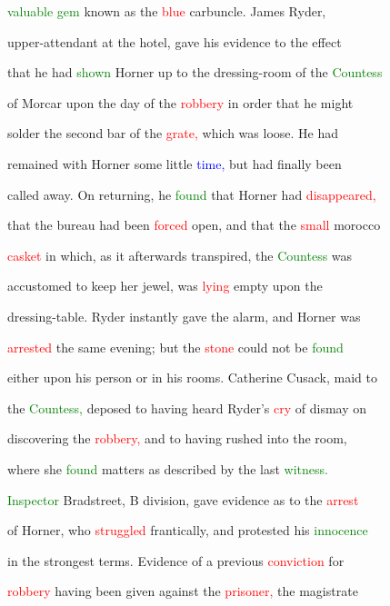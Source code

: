  \textcolor{green}{valuable} \textcolor{green}{gem} known as the \textcolor{red}{blue} carbuncle. James Ryder,

 upper-attendant at the hotel, gave his evidence to the effect

 that he had \textcolor{green}{shown} Horner up to the dressing-room of the \textcolor{green}{Countess}

 of Morcar upon the day of the \textcolor{red}{robbery} in order that he might

 solder the second bar of the \textcolor{red}{grate,} which was loose. He had

 remained with Horner some little \textcolor{blue}{time,} but had \textcolor{BurntOrange}{finally} been

 called away. On returning, he \textcolor{green}{found} that Horner had \textcolor{red}{disappeared,}

 that the bureau had been \textcolor{red}{forced} open, and that the \textcolor{red}{small} morocco

 \textcolor{red}{casket} in which, as it afterwards transpired, the \textcolor{green}{Countess} was

 accustomed to keep her jewel, was \textcolor{red}{lying} empty upon the

 dressing-table. Ryder instantly gave the \textcolor{BurntOrange}{alarm,} and Horner was

 \textcolor{red}{arrested} the same evening; but the \textcolor{red}{stone} could not be \textcolor{green}{found}

 either upon his person or in his rooms. Catherine Cusack, maid to

 the \textcolor{green}{Countess,} deposed to having heard Ryder's \textcolor{red}{cry} of \textcolor{BurntOrange}{dismay} on

 discovering the \textcolor{red}{robbery,} and to having rushed into the room,

 where she \textcolor{green}{found} matters as described by the last \textcolor{green}{witness.}

 \textcolor{green}{Inspector} Bradstreet, B division, gave evidence as to the \textcolor{red}{arrest}

 of Horner, who \textcolor{red}{struggled} frantically, and protested his \textcolor{green}{innocence}

 in the strongest terms. Evidence of a previous \textcolor{red}{conviction} for

 \textcolor{red}{robbery} having been given against the \textcolor{red}{prisoner,} the magistrate

